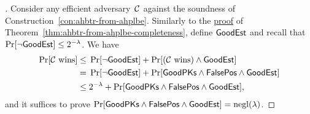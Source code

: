 \begin{proof}[]
Consider any efficient adversary~${\mathcal{C}}$ against the soundness of Construction~\ref{con:ahbtr-from-ahplbe}.
Similarly to the \hyperlink{pf:ahbtr-from-ahplbe-completeness}{proof} of Theorem~\ref{thm:ahbtr-from-ahplbe-completeness},
define $\GoodEst$ and recall that ${\Pr[\neg\GoodEst]\leq 2^{-\lambda}}$.
We have
\begin{align*}
\Pr[\scriptC\textup{ wins}]
\leq{}&
\Pr[\neg\GoodEst]
+
\Pr[(\scriptC\textup{ wins})\wedge\GoodEst]
\\{}={}&
\Pr[\neg\GoodEst]
+
\Pr[\GoodPKs\wedge\FalsePos\wedge\GoodEst]
\\{}\leq{}&
2^{-\lambda}
+
\Pr[\GoodPKs\wedge\FalsePos\wedge\GoodEst],
\end{align*}
and it suffices to prove ${\Pr[\GoodPKs\wedge\FalsePos\wedge\GoodEst]=\negl(\lambda)}$.


\end{proof}
